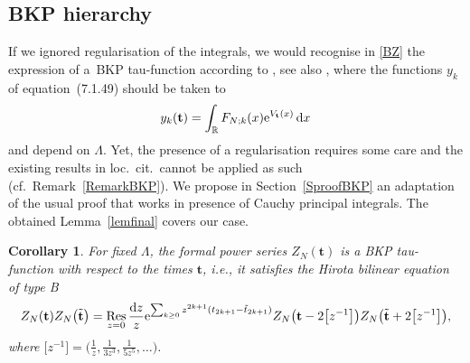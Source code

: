 \documentclass[pdftex]{sigma}
\numberwithin{equation}{section}
\newcommand{\dd}{\mathrm{d}}
\newtheorem{Corollary}[Theorem]{Corollary}
\begin{document}
\subsection{BKP hierarchy}

If we ignored regularisation of the integrals, we would recognise in \eqref{BZ} the expression of a~BKP tau-function according to
\cite{Nimmo_1990}, see also \cite[Section~7.1.2.3]{harnad_balogh_2021}, where the functions $y_k$ of equation~(7.1.49) should be taken to
\[
y_k(\mathbf{t}) = \int_{\mathbb{R}} F_{N;k}(x) {\rm e}^{V_{\mathbf{t}}(x)}\,\dd x
\]
and depend on $\Lambda$. Yet, the presence of a regularisation
requires some care and the existing results in loc.\ cit.\ cannot be
applied as such (cf.\ Remark~\ref{RemarkBKP}). We propose in
Section~\ref{SproofBKP} an adaptation of the usual proof that works in
presence of Cauchy principal integrals. The obtained
Lemma~\ref{lemfinal} covers our case.


\begin{Corollary}
 \label{Comain} For fixed $\Lambda$, the formal power series
 $Z_N(\mathbf{t})$ is a BKP tau-function with respect to the times
 $\mathbf{t}$, i.e., it satisfies the Hirota bilinear equation of
 type B
\begin{equation}
\label{biline}
Z_N(\mathbf{t})Z_N\bigl(\tilde{\mathbf{t}}\bigr) = \mathop{{\rm Res}}_{z = 0} \frac{\dd z}{z} {\rm e}^{\sum_{k \geq 0} z^{2k + 1}(t_{2k + 1} - \tilde{t}_{2k + 1})} Z_N\bigl(\mathbf{t} - 2\bigl[z^{-1}\bigr]\bigr) Z_N\bigl(\tilde{\mathbf{t}} + 2\bigl[z^{-1}\bigr]\bigr),
\end{equation}
where $\bigl[z^{-1}\bigr] = \bigl(\frac{1}{z},\frac{1}{3z^3},\frac{1}{5z^5},\dots\bigr)$.
\end{Corollary}
\end{document}
